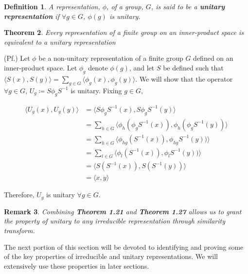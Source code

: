 \documentclass[10pt]{ucthesis}
\newtheorem{definition}{Definition}[chapter]
\newtheorem{theorem}[definition]{Theorem}
\newtheorem{remark}[definition]{Remark}
\begin{document}
\begin{definition}
	A representation, $\phi$, of a group, $G$, is said to be a \textbf{unitary representation} if $\forall g\in G$, $\phi(g)$ is unitary.
\end{definition}

\begin{theorem}
	Every representation of a finite group on an inner-product space is equivalent to a unitary representation
\end{theorem}

\noindent (Pf.) Let $\phi$ be a non-unitary representation of a finite group $G$ defined on an inner-product space. Let $\phi_g$ denote $\phi(g)$, and let $S$ be defined such that $\langle S(x) , S(y) \rangle = \sum_{g \in G} \langle \phi_g (x) , \phi_g (y) \rangle$. We will show that the operator $\forall g \in G$, $U_g \coloneq S\phi_gS^{-1}$ is unitary. Fixing $g\in G$,


\begin{equation}
	\begin{aligned}
		\langle U_g(x) , U_g(y) \rangle &= \langle S\phi_gS^{-1}(x) , S\phi_gS^{-1}(y)\rangle \\
									&= \sum_{h \in G} \langle \phi_h(\phi_gS^{-1}(x)) , \phi_h(\phi_gS^{-1}(y))\rangle \\
									&= \sum_{h\in G} \langle \phi_{hg}(S^{-1}(x)) , \phi_{hg}S^{-1}(y))\rangle \\
									&= \sum_{l\in G} \langle \phi_{l}(S^{-1}(x)) , \phi_{l}S^{-1}(y))\rangle \\
									&= \langle S(S^{-1}(x)) , S(S^{-1}(y))\rangle \\
									&= \langle x , y \rangle 
	\end{aligned}
\end{equation}

Therefore, $U_g$ is unitary $\forall g \in G$. \qedsymbol

\begin{remark}
	Combining \textbf{Theorem 1.21} and \textbf{Theorem 1.27} allows us to grant the property of unitary to any irreducible representation through similarity transform. 
\end{remark}

The next portion of this section will be devoted to identifying and proving some of the key properties of irreducible and unitary representations. We will extensively use these properties in later sections.
\end{document}
